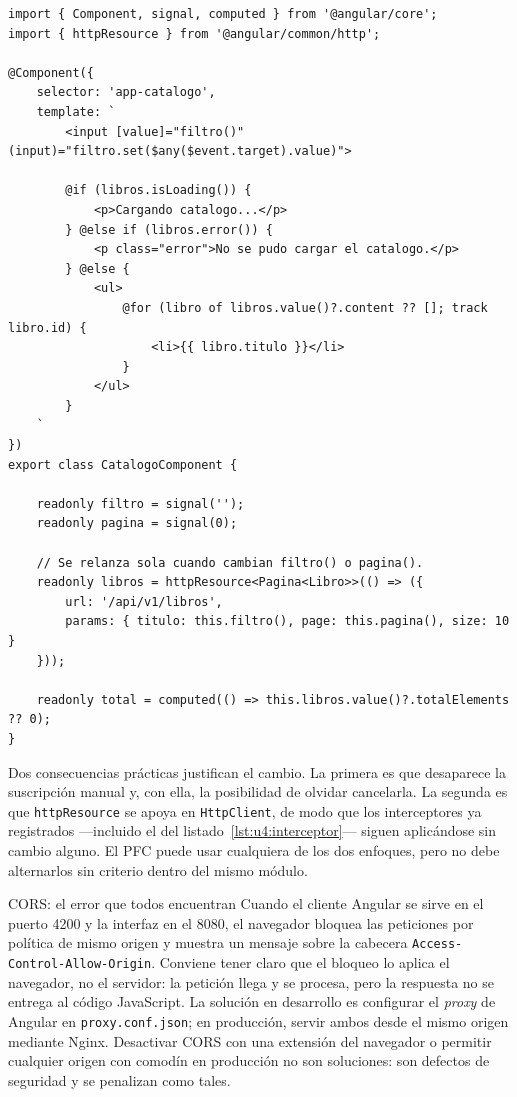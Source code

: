 \documentclass[11pt,a4paper,openany]{book}
\begin{document}
\begin{lstlisting}[style=ts,caption={Carga reactiva del catalogo con httpResource y senales.},label={lst:u4:httpresource}]
import { Component, signal, computed } from '@angular/core';
import { httpResource } from '@angular/common/http';

@Component({
	selector: 'app-catalogo',
	template: `
		<input [value]="filtro()" (input)="filtro.set($any($event.target).value)">

		@if (libros.isLoading()) {
			<p>Cargando catalogo...</p>
		} @else if (libros.error()) {
			<p class="error">No se pudo cargar el catalogo.</p>
		} @else {
			<ul>
				@for (libro of libros.value()?.content ?? []; track libro.id) {
					<li>{{ libro.titulo }}</li>
				}
			</ul>
		}
	`
})
export class CatalogoComponent {

	readonly filtro = signal('');
	readonly pagina = signal(0);

	// Se relanza sola cuando cambian filtro() o pagina().
	readonly libros = httpResource<Pagina<Libro>>(() => ({
		url: '/api/v1/libros',
		params: { titulo: this.filtro(), page: this.pagina(), size: 10 }
	}));

	readonly total = computed(() => this.libros.value()?.totalElements ?? 0);
}
\end{lstlisting}

Dos consecuencias prácticas justifican el cambio. La primera es que desaparece la suscripción manual y, con ella, la posibilidad de olvidar cancelarla. La segunda es que \texttt{httpResource} se apoya en \texttt{HttpClient}, de modo que los interceptores ya registrados ---incluido el del listado~\ref{lst:u4:interceptor}--- siguen aplicándose sin cambio alguno. El PFC puede usar cualquiera de los dos enfoques, pero no debe alternarlos sin criterio dentro del mismo módulo.

\begin{cajaadvertencia}{CORS: el error que todos encuentran}
	Cuando el cliente Angular se sirve en el puerto 4200 y la interfaz en el 8080, el navegador bloquea las peticiones por política de mismo origen y muestra un mensaje sobre la cabecera \texttt{Access-Control-Allow-Origin}. Conviene tener claro que el bloqueo lo aplica el navegador, no el servidor: la petición llega y se procesa, pero la respuesta no se entrega al código JavaScript. La solución en desarrollo es configurar el \emph{proxy} de Angular en \texttt{proxy.conf.json}; en producción, servir ambos desde el mismo origen mediante Nginx. Desactivar CORS con una extensión del navegador o permitir cualquier origen con comodín en producción no son soluciones: son defectos de seguridad y se penalizan como tales.
\end{cajaadvertencia}
\end{document}
